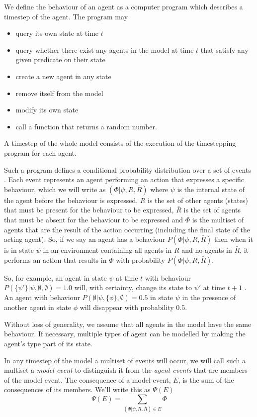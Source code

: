\documentclass{article}
\begin{document}
We define the behaviour of an agent as a computer program which describes a timestep of the agent. The program may
\begin{itemize}
\item query its own state at time $t$
\item query whether there exist any agents in the model at time $t$ that satisfy any given predicate on their state
\item create a new agent in any state
\item remove itself from the model
\item modify its own state
\item call a function that returns a random number.
\end{itemize}
A timestep of the whole model consists of the execution of the timestepping program for each agent.

Such a program defines a conditional probability distribution over a set of events \cite{staton2016semantics}. Each event represents an agent performing an action that expresses a specific behaviour, which we will write as $(\Phi|\psi,R,\bar{R})$ where $\psi$ is the internal state of the agent before the behaviour is expressed, $R$ is the set of other agents (states) that must be present for the behaviour to be expressed, $\bar{R}$ is the set of agents that must be absent for the behaviour to be expressed and $\Phi$ is the multiset of agents that are the result of the action occurring (including the final state of the acting agent). So, if we say an agent has a behaviour $P(\Phi|\psi,R,\bar{R})$ then when it is in state $\psi$ in an environment containing all agents in $R$ and no agents in $\bar{R}$, it performs an action that results in $\Phi$ with probability $P(\Phi|\psi,R,\bar{R})$.

So, for example, an agent in state $\psi$ at time $t$ with behaviour $P(\{\psi'\}|\psi,\emptyset,\emptyset) = 1.0$ will, with certainty, change its state to $\psi'$ at time $t+1$ . An agent with behaviour $P(\emptyset|\psi,\{\phi\},\emptyset) = 0.5$ in state $\psi$ in the presence of another agent in state $\phi$ will disappear with probability $0.5$.

Without loss of generality, we assume that all agents in the model have the same behaviour. If necessary, multiple types of agent can be modelled by making the agent's type part of its state.

In any timestep of the model a multiset of events will occur, we will call such a multiset a \textit{model event} to distinguish it from the \textit{agent events} that are members of the model event. The consequence of a model event, $E$, is the sum of the consequences of its members. We'll write this as $\Psi(E)$
\begin{equation}
\Psi(E) = \sum_{(\Phi|\psi,R,\bar{R})\in E}\Phi
\label{psie}
\end{equation}
\end{document}
